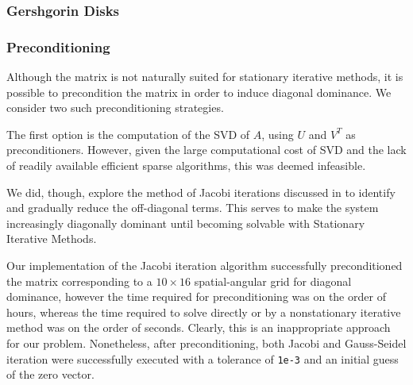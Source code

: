 \documentclass[10pt]{article}
\begin{document}
\begin{multicols}{2}
\subsubsection{Gershgorin Disks}


% 

\subsubsection{Preconditioning}

Although the matrix is not naturally suited for stationary iterative methods, it is possible to precondition the matrix in order to induce diagonal dominance.
We consider two such preconditioning strategies.

The first option is the computation of the SVD of $A$, using $U$ and $V^T$ as preconditioners.
However, given the large computational cost of SVD and the lack of readily available efficient sparse algorithms, this was deemed infeasible.

We did, though, explore the method of Jacobi iterations discussed in \citet{yuan_method_2006} to identify and gradually reduce the off-diagonal terms.
This serves to make the system increasingly diagonally dominant until becoming solvable with Stationary Iterative Methods.
 
Our implementation of the Jacobi iteration algorithm successfully preconditioned the matrix corresponding to a $10\times 16$ spatial-angular grid for diagonal dominance, however the time required for preconditioning was on the order of hours, whereas the time required to solve directly or by a nonstationary iterative method was on the order of seconds.
Clearly, this is an inappropriate approach for our problem.
Nonetheless, after preconditioning, both Jacobi and Gauss-Seidel iteration were successfully executed with a tolerance of \texttt{1e-3} and an initial guess of the zero vector.


\end{multicols}
\end{document}

